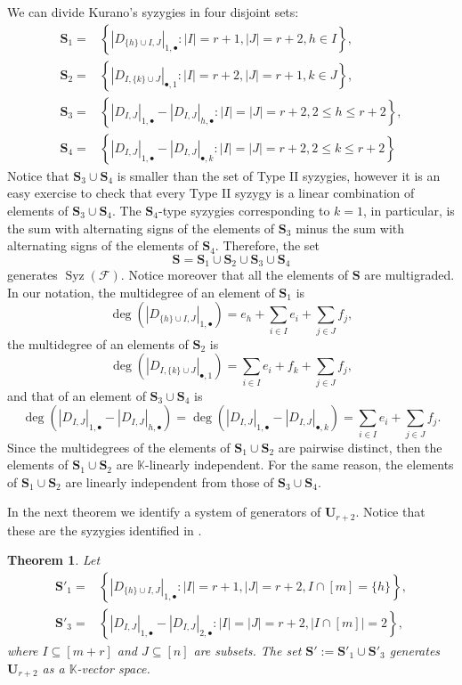\documentclass[utf8,latin1]{article}
\newtheorem{theorem}{Theorem}
\DeclareMathOperator{\Syz}{Syz}
\newcommand{\KK}{\mathbb{K}}
\newcommand{\abs}[1]{\ensuremath{\left\lvert #1 \right\rvert}}
\begin{document}
We can divide Kurano's syzygies in four disjoint sets:
\begin{align*}
\mathbf{S}_1=& \left\{
|D_{\{h\}\cup I,J}|_{1,\bullet}: \abs{I}=r+1, \abs{J} = r+2, h \in I \right\},\\	
\mathbf{S}_2=& \left\{
|D_{I,\{k\}\cup J}|_{\bullet,1}
: \abs{I} =r+2, \abs{J} = r+1, k \in J \right\},\\
\mathbf{S}_3=& \left\{
|D_{I,J}|_{1,\bullet}-|D_{I,J}|_{h,\bullet}
: \abs{I} = \abs{J}=r+2, 2\leq h \leq r+2\right\},\\
\mathbf{S}_4=& \left\{
|D_{I,J}|_{1,\bullet} - |D_{I,J}|_{\bullet,k}: \abs{I} = \abs{J} =r+2, 2\leq k\leq r+2\right\}
\end{align*}
Notice that $\mathbf{S}_3 \cup \mathbf{S}_4$ is smaller than the set of Type II syzygies, however it is an easy exercise to check that every Type II syzygy is a linear combination of elements of $\mathbf{S}_3 \cup \mathbf{S}_4$. The $\mathbf{S}_4$-type syzygies corresponding to $k=1$, in particular, is the sum with alternating signs of the elements of $\mathbf{S}_3$ minus the sum with alternating signs of the elements of $\mathbf{S}_4$. Therefore, the set $$\mathbf{S}=\mathbf{S}_1 \cup \mathbf{S}_2 \cup \mathbf{S}_3 \cup \mathbf{S}_4$$ generates $\Syz(\mathcal{F})$.
Notice moreover that all the elements of $\mathbf{S}$ are multigraded. In our notation, the multidegree of an element of $\mathbf{S}_1$ is
$$\deg(|D_{\{h\}\cup I,J}|_{1,\bullet})=e_h + \sum_{i \in I} e_i + \sum_{j \in J} f_j,$$
the multidegree of an elements of $\mathbf{S}_2$ is 
$$\deg(|D_{I,\{k\}\cup J}|_{\bullet,1})=\sum_{i \in I} e_i + f_k + \sum_{j \in J} f_j,$$
and that of an element of $\mathbf{S}_3\cup \mathbf{S}_4$ is $$\deg(|D_{I,J}|_{1,\bullet}-|D_{I,J}|_{h,\bullet})=\deg(|D_{I,J}|_{1,\bullet} - |D_{I,J}|_{\bullet,k})=
\sum_{i \in I} e_i + \sum_{j \in J} f_j.$$
Since the multidegrees of the elements of $\mathbf{S}_1\cup\mathbf{S}_2$ are pairwise distinct, then the elements of $\mathbf{S}_1\cup\mathbf{S}_2$ are $\mathbb{K}$-linearly independent. For the same reason, the elements of $\mathbf{S}_1\cup\mathbf{S}_2$ are linearly independent from those of $\mathbf{S}_3\cup\mathbf{S}_4$.

\medskip
In the next theorem we identify a system of generators of $\mathbf{U}_{r+2}$.
Notice that these are the syzygies identified in \cite{BBCGPSTV20}.

\begin{theorem}\label{thm:U}
Let
\begin{align*} 
\mathbf{S}'_1= &\left\{
|D_{\{h\}\cup I,J}|_{1,\bullet}
: \abs{I} =r+1, \abs{J} = r+2, I \cap [m]= \{h\} \right\},\\
\mathbf{S}'_3= &\left\{
|D_{I,J}|_{1,\bullet}-|D_{I,J}|_{2,\bullet}
: \abs{I}=\abs{J}=r+2, |I \cap [m]| = 2 \right\},
\end{align*}
where $I \subseteq [m+r]$ and $J \subseteq [n]$ are subsets. The set $\mathbf{S}':=\mathbf{S}'_1 \cup \mathbf{S}'_3$ generates $\mathbf{U}_{r+2}$ as a $\KK$-vector space.
\end{theorem}	 
\end{document}
